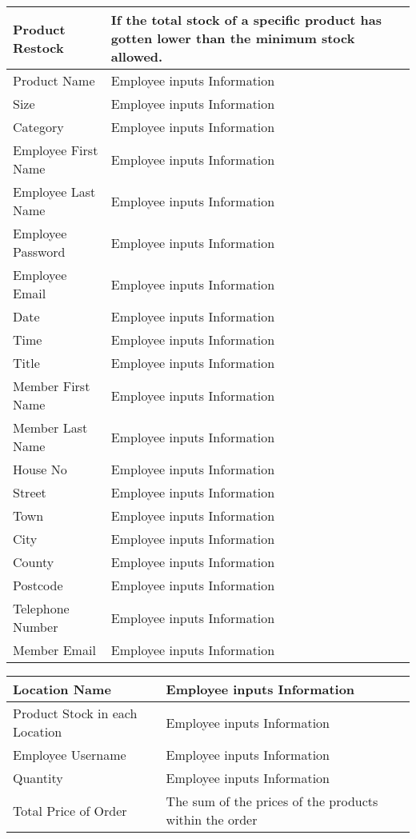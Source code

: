 	
 \begin{tabular}{|p{4cm}|p{4cm}|}
        \hline
        	{Product Restock} & {If the total stock of a specific product has gotten lower than the minimum stock allowed.}\\ \hline
	{Product Name} & {Employee inputs Information}\\ \hline
	{Size} & {Employee inputs Information}\\ \hline
	{Category} & {Employee inputs Information}\\ \hline
	{Employee First Name} & {Employee inputs Information}\\ \hline
	{Employee Last Name} & {Employee inputs Information}\\ \hline
	{Employee Password} & {Employee inputs Information}\\ \hline
	{Employee Email} & {Employee inputs Information}\\ \hline
	{Date} & {Employee inputs Information}\\ \hline
	{Time} & {Employee inputs Information}\\ \hline
	{Title} & {Employee inputs Information}\\ \hline
	{Member First Name} & {Employee inputs Information}\\ \hline
	{Member Last Name} & {Employee inputs Information}\\ \hline
	{House No} & {Employee inputs Information}\\ \hline
	{Street} & {Employee inputs Information}\\ \hline
	{Town} & {Employee inputs Information}\\ \hline
	{City} & {Employee inputs Information}\\ \hline
	{County} & {Employee inputs Information}\\ \hline
	{Postcode} & {Employee inputs Information}\\ \hline
	{Telephone Number} & {Employee inputs Information}\\ \hline
	{Member Email} & {Employee inputs Information}\\ \hline
	\end{tabular}
	
 \begin{tabular}{|p{4cm}|p{4cm}|}
        \hline	
	{Location Name} & {Employee inputs Information}\\ \hline
	{Product Stock in each Location} & {Employee inputs Information}\\ \hline
	{Employee Username} & {Employee inputs Information}\\ \hline
	{Quantity} & {Employee inputs Information}\\ \hline
	{Total Price of Order} & {The sum of the prices of the products within the order} \\ \hline
   \end{tabular}

